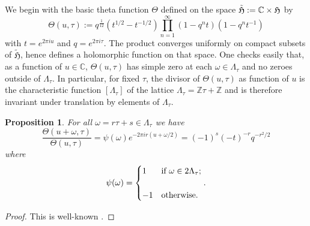 \documentclass[12pt,amstex,amssymb]{article}
\theoremstyle{plain}
\newtheorem{proposition}[theorem]{Proposition}
\newtheorem{lemma}[theorem]{Lemma}
\theoremstyle{definition}
\def\fH{{\frak H}}
\def\Z{{\mathbb Z}}
\def\C{{\mathbb C}}
\newcommand{\ba}{\mathbf{a}}
\newcommand{\tfH}{\tilde{\mathfrak{H}}}
\begin{document}




We begin with the basic theta function $\Theta$ defined on the space $\tfH := \C\times \fH$ by
$$
\Theta(u,\tau) := q^{\frac{1}{12}}(t^{1/2} - t^{-1/2}) \prod_{n=1}^\infty \left(1 - q^nt\right) \left(1 - q^nt^{-1}\right)
$$
with $t = e^{2\pi i u}$ and $q=e^{2\pi i \tau}$.  The product converges uniformly on compact subsets of $\tfH$, hence defines a holomorphic function on that space.  One checks easily that, as a function of $u\in \C$, $\Theta(u,\tau)$ has simple zero at each $\omega\in \Lambda_\tau$ and no zeroes outside of $\Lambda_\tau$.  In particular, for fixed $\tau$, the divisor of $\Theta(u,\tau)$ as function of $u$ is the characteristic function $[\Lambda_\tau]$ of the lattice $\Lambda_\tau=\Z\tau+\Z$ and is therefore invariant under translation by elements of $\Lambda_\tau$.   

\begin{proposition}\label{Theta:transform}
	For all $\omega = r\tau + s \in \Lambda_\tau$ we have
	$$
	\frac{\Theta(u+\omega,\tau)}{\Theta(u,\tau)} = \psi(\omega)e^{-2\pi i r (u + \omega/2)} = (-1)^s(-t)^{-r}q^{-r^2/2}
	$$
	where 
	$$
	\psi(\omega) = \begin{cases}
		1&\hbox{\rm if $\omega\in 2\Lambda_\tau$;}\\
		\\
		-1&\hbox{\rm otherwise.}\\
	\end{cases}.
	$$ 
\end{proposition}

\begin{proof} 
	This is well-known \cite{Lang}.
\end{proof}
\end{document}
